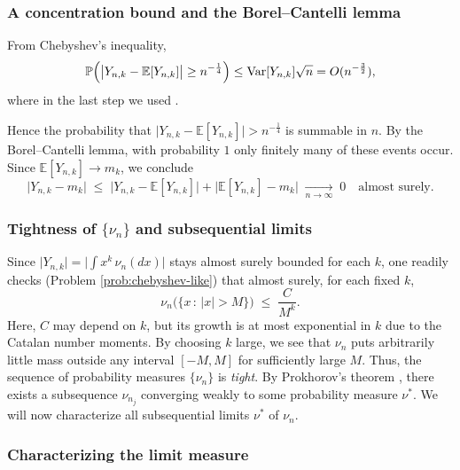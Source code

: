 \documentclass[letterpaper,11pt,oneside,reqno]{article}
\numberwithin{equation}{section}
\theoremstyle{definition}
\begin{document}
\subsubsection{A concentration bound and the Borel--Cantelli lemma}
From Chebyshev's inequality,
\[
  \mathbb{P}\Bigl(\bigl|Y_{n,k} - \mathbb{E}[Y_{n,k}]\bigr|
	\ge n^{-\frac{1}{4}}\Bigr)
  \le
  \operatorname{\mathrm{Var}}[Y_{n,k}]\sqrt{n}
	=O(n^{-\frac{3}{2}}),
\]
where in the last step we used .

Hence the probability that \(\lvert Y_{n,k} - \mathbb{E}[Y_{n,k}]\rvert > n^{-\frac{1}{4}}\) is summable in \(n\).  By the Borel--Cantelli lemma, with probability \(1\) only finitely many of these events occur.  Since \(\mathbb{E}[Y_{n,k}]\to m_k\), we conclude
\[
  \bigl|Y_{n,k} - m_k\bigr|
  \;\le\;\bigl|Y_{n,k}-\mathbb{E}[Y_{n,k}]\bigr|
  +\bigl|\mathbb{E}[Y_{n,k}]-m_k\bigr|
  \;\xrightarrow[n\to\infty]{}\;0
  \quad
  \text{almost surely.}
\]

\subsubsection{Tightness of \(\{\nu_n\}\) and subsequential limits}
\label{subsub:semicircle-tightness}

Since \(\lvert Y_{n,k}\rvert = \bigl|\int x^k\,\nu_n(dx)\bigr|\) stays
almost surely
bounded for each \(k\), one readily checks
(Problem \ref{prob:chebyshev-like})
that almost surely, for each fixed \(k\),
\begin{equation}
	\label{eq:chebyshev-like}
  \nu_n\bigl(\{x\,:\,|x|>M\}\bigr)
	\;\le\; \frac{C}{M^k}.
\end{equation}
Here, $C$ may depend on $k$, but 
its growth is at most exponential in \(k\)
due to the Catalan number moments.
By choosing \(k\) large, we see that \(\nu_n\) puts
arbitrarily little mass outside any interval
\([-M,M]\) for sufficiently large $M$.  Thus, the
sequence of probability measures
\(\{\nu_n\}\) is \emph{tight}.
By Prokhorov’s theorem \cite[Theorem~25.10]{billingsley1995probability},
there exists a subsequence \(\nu_{n_j}\) converging weakly to some probability measure \(\nu^*\).
We will now characterize all subsequential limits $\nu^*$ of $\nu_n$.

\subsubsection{Characterizing the limit measure}
\label{subsub:semicircle-characterization}
\end{document}
